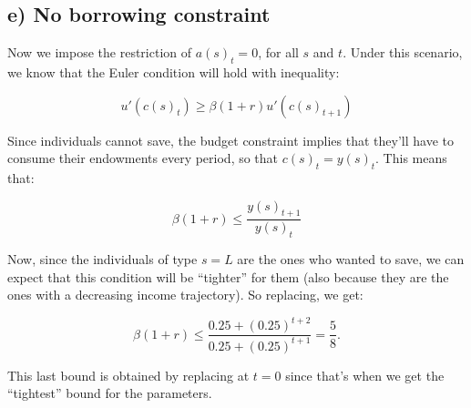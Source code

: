 \documentclass[11pt]{article}
\begin{document}
    \hypertarget{e-no-borrowing-constraint}{%
\subsection{e) No borrowing
constraint}\label{e-no-borrowing-constraint}}

Now we impose the restriction of \(a(s)_t=0\), for all \(s\) and \(t\).
Under this scenario, we know that the Euler condition will hold with
inequality:

\[
u'(c(s)_t)\geq \beta (1+r) u'(c(s)_{t+1})
\]

Since individuals cannot save, the budget constraint implies that
they'll have to consume their endowments every period, so that
\(c(s)_t=y(s)_t\). This means that:

\[
\beta(1+r)\leq \frac{y(s)_{t+1}}{y(s)_{t}}
\]

Now, since the individuals of type \(s=L\) are the ones who wanted to
save, we can expect that this condition will be ``tighter'' for them
(also because they are the ones with a decreasing income trajectory). So
replacing, we get:

\[
\beta(1+r)\leq \frac{0.25+(0.25)^{t+2}}{0.25+(0.25)^{t+1}}=\frac{5}{8}.
\]

This last bound is obtained by replacing at \(t=0\) since that's when we
get the ``tightest'' bound for the parameters.


    
    
    
\end{document}
